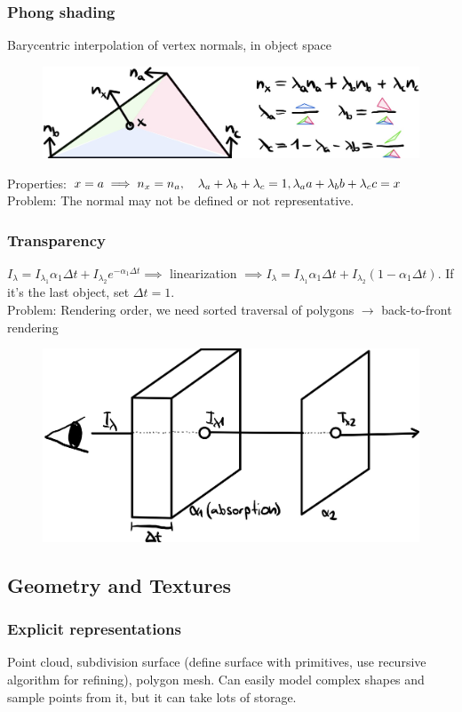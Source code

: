 \documentclass[a4paper,10pt]{article}
\begin{document}
\subsubsection{Phong shading} Barycentric interpolation of vertex normals, in object space
\begin{figure}[H]
    \includegraphics[width=\linewidth]{phong-shading.jpeg}
\end{figure}

Properties: \( x = a \implies n_x = n_a, \quad \lambda_a+\lambda_b +\lambda_c = 1, \\ \lambda_a a+ \lambda_b b + \lambda_c c = x \)
Problem: The normal may not be defined or not representative.

\subsubsection{Transparency} \( I_\lambda = I_{\lambda_1} \alpha_1 \Delta t + I_{\lambda_2} e^{-\alpha_1 \Delta t} \implies \) linearization \( \implies I_\lambda = I_{\lambda_1} \alpha_1 \Delta t + I_{\lambda_2} (1-\alpha_1 \Delta t) \). If it's the last object, set \( \Delta t = 1 \). \\
Problem: Rendering order, we need sorted traversal of polygons \( \to  \) back-to-front rendering

\begin{figure}[h]
    \centering
    \includegraphics[width=0.6\linewidth]{transparency.jpeg}
\end{figure}

\subsection{Geometry and Textures}
\subsubsection{Explicit representations} Point cloud, subdivision surface (define surface with primitives, use recursive algorithm for refining), polygon mesh. Can easily model complex shapes and sample points from it, but it can take lots of storage.
\end{document}
